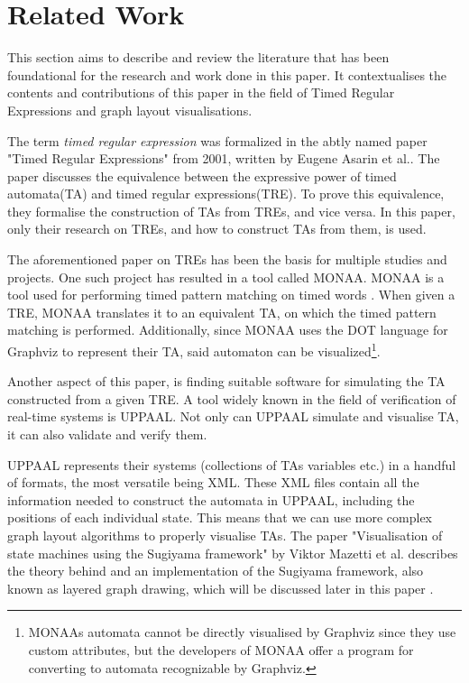 \section{Related Work}\label{sec:related work}



This section aims to describe and review the literature that has been foundational for the research and work done in this paper. It contextualises the contents and contributions of this paper in the field of Timed Regular Expressions and graph layout visualisations.

The term \textit{timed regular expression} was formalized in the abtly named paper "Timed Regular Expressions" from 2001, written by Eugene Asarin et al.\cite{Eugene2001}. The paper discusses the equivalence between the expressive power of timed automata(TA)\cite{ALUR1994} and timed regular expressions(TRE). To prove this equivalence, they formalise the construction of TAs from TREs, and vice versa. In this paper, only their research on TREs, and how to construct TAs from them, is used.

The aforementioned paper on TREs has been the basis for multiple studies and projects. One such project has resulted in a tool called MONAA. MONAA is a tool used for performing timed pattern matching on timed words \cite{MONAA2017}. When given a TRE, MONAA translates it to an equivalent TA, on which the timed pattern matching is performed. Additionally, since MONAA uses the DOT language for Graphviz \cite{Graphviz} to represent their TA, said automaton can be visualized\footnote{MONAAs automata cannot be directly visualised by Graphviz since they use custom attributes, but the developers of MONAA offer a program for converting to automata recognizable by Graphviz\cite{MONAA2017}.}.

Another aspect of this paper, is finding suitable software for simulating the TA constructed from a given TRE. A tool widely known in the field of verification of real-time systems is UPPAAL. Not only can UPPAAL simulate and visualise TA, it can also validate and verify them\cite{UPPAAL}.

UPPAAL represents their systems (collections of TAs variables etc.) in a handful of formats, the most versatile being XML\cite{UPPAAL}. These XML files contain all the information needed to construct the automata in UPPAAL, including the positions of each individual state. This means that we can use more complex graph layout algorithms to properly visualise TAs. The paper "Visualisation of state machines using the Sugiyama framework" by Viktor Mazetti et al. describes the theory behind and an implementation of the Sugiyama framework, also known as layered graph drawing, which will be discussed later in this paper \cite{Mazetti2012}.